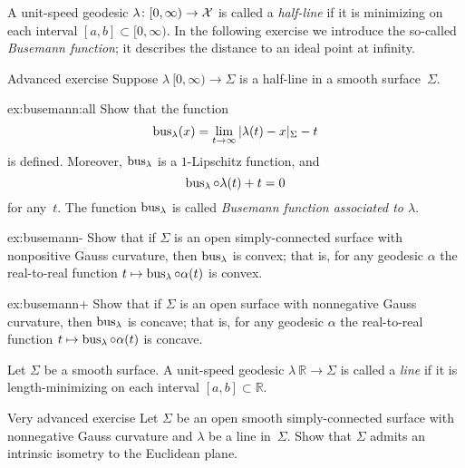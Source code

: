 A unit-speed geodesic $\lambda\colon[0,\infty)\to \mathcal{X}$ is called a \emph{half-line} if it is minimizing on each interval $[a,b]\subset [0,\infty)$.
In the following exercise we introduce the so-called
{}\emph{Busemann function};
it describes the distance to an ideal point at infinity.

\begin{thm}{Advanced exercise}\label{ex:busemann}
Suppose $\lambda\:[0,\infty)\to \Sigma$ is a half-line in a smooth surface~$\Sigma$.

\begin{subthm}{ex:busemann:all}
Show that the function 
\[\bus_\lambda(x)=\lim_{t\to\infty}\dist{\lambda(t)}{x}{\Sigma}- t\]
is defined.
Moreover, 
$\mathop{\rm bus}\nolimits_\lambda$ is a $1$-Lipschitz function, and
\[\mathop{\rm bus}\nolimits_\lambda\circ\lambda(t)+t=0\] 
for any~$t$.
The function $\mathop{\rm bus}\nolimits_\lambda$ is called \emph{Busemann function associated to $\lambda$}.
\end{subthm}

\begin{subthm}{ex:busemann-}
Show that if $\Sigma$ is an open simply-connected surface with nonpositive Gauss curvature, then $\mathop{\rm bus}\nolimits_\lambda$ is convex;
that is, for any geodesic $\alpha$ the real-to-real function 
$t\mapsto \mathop{\rm bus}\nolimits_\lambda\circ\alpha(t)$ is convex.
\end{subthm}

\begin{subthm}{ex:busemann+}
Show that if $\Sigma$ is an open surface with nonnegative Gauss curvature, then $\mathop{\rm bus}\nolimits_\lambda$ is concave;
that is, for any geodesic $\alpha$ the real-to-real function 
$t\z\mapsto \bus_\lambda\circ\alpha(t)$ is concave.
\end{subthm}

\end{thm}

Let $\Sigma$ be a smooth surface.
A unit-speed geodesic $\lambda\:\mathbb{R}\to\Sigma$ is called a \emph{line} if it is length-minimizing on each interval $[a,b]\subset \mathbb{R}$.

\begin{thm}{Very advanced exercise}\label{thm:splitting}
Let $\Sigma$ be an open smooth simply-connected surface with nonnegative Gauss curvature
and $\lambda$ be a line in~$\Sigma$. 
Show that $\Sigma$ admits an intrinsic isometry to 
the Euclidean plane.
\end{thm}

